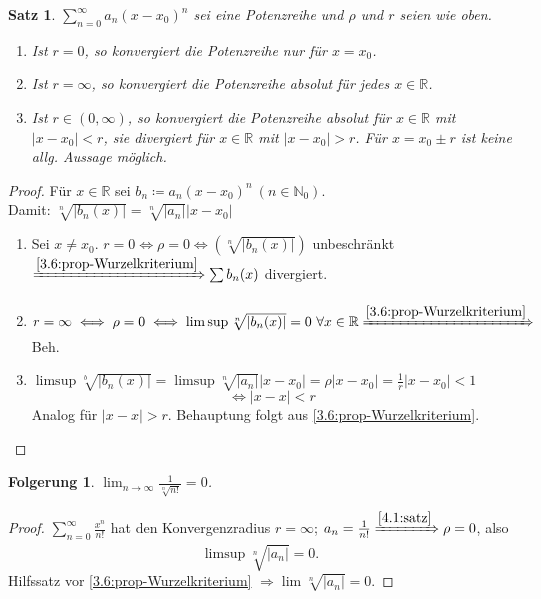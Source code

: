 \documentclass[titlepage,ngerman,a4paper,headsepline]{scrartcl}
\newcommand{\N}{\mathbb{N}}
\newcommand{\R}{\mathbb{R}}
\theoremstyle{named}
\theoremstyle{dotless}
\newtheorem{satz}[namedtheorem]{Satz}
\newtheorem*{folgerung*}{Folgerung}
\begin{document}
\begin{satz} \label{4.1:satz}
	$\sum_{n=0}^{\infty} a_{n} (x - x_{0})^{n}$ sei eine Potenzreihe und $\rho$ und $r$ seien wie oben.
	\begin{enumerate}
		\item Ist $r = 0$, so konvergiert die Potenzreihe nur für $x = x_{0}$.
		\item Ist $r = \infty$, so konvergiert die Potenzreihe absolut für jedes $x \in \R$.
		\item Ist $r \in (0, \infty)$, so konvergiert die Potenzreihe absolut für $x \in \R$ mit $|x - x_{0}| < r$, sie divergiert für $x \in \R$ mit $|x - x_{0}| > r$. Für $x = x_{0} \pm r$ ist keine allg. Aussage möglich.
	\end{enumerate}
\end{satz}

\begin{proof}
	Für $x \in \R$ sei $b_{n} \coloneqq a_{n} (x - x_{0})^{n} ~(n \in \N_{0})$. \\
	Damit: $\sqrt[n]{|b_{n}(x)|} = \sqrt[n]{|a_{n}|} |x - x_{0}|$
	\begin{enumerate}
		\item Sei $x \neq x_{0}$. $r = 0 \iff \rho = 0 \iff \left( \sqrt[n]{|b_{n}(x)|} \right)$ unbeschränkt $\xRightarrow[]{\ref{3.6:prop-Wurzelkriterium}} \sum b_{n}(x)$ divergiert.
		\item $r = \infty \iff \rho = 0 \iff \limsup \sqrt[n]{|b_{n}(x)|} = 0 ~\forall x \in \R \xRightarrow[]{\ref{3.6:prop-Wurzelkriterium}}$ Beh.
		\item $\limsup \sqrt[b]{|b_{n}(x)|} = \limsup \sqrt[n]{|a_{n}|} |x - x_{0}| = \rho |x - x_{0}| = \frac{1}{r} |x - x_{0}| < 1$ 
			$$ \iff |x - x| < r $$
			Analog für $|x - x| > r$. Behauptung folgt aus \ref{3.6:prop-Wurzelkriterium}.
	\end{enumerate}	
\end{proof}


\begin{folgerung*}
	$\lim_{n \rightarrow \infty} \frac{1}{\sqrt[n]{n!}} = 0$.	
\end{folgerung*}

\begin{proof}
	$\sum_{n=0}^{\infty} \frac{x^{n}}{n!}$ hat den Konvergenzradius $r = \infty$; $a_{n} = \frac{1}{n!} \xRightarrow[]{\ref{4.1:satz}} \rho = 0$, also 
	$$ \limsup \sqrt[n]{|a_{n}|} = 0. $$
	Hilfssatz vor \ref{3.6:prop-Wurzelkriterium} $\Rightarrow \lim \sqrt[n]{|a_{n}|} = 0$.
\end{proof}
\end{document}
